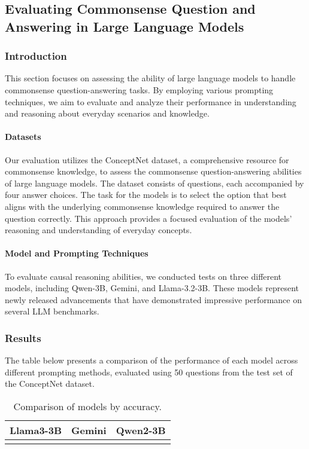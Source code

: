 \subsection{Evaluating Commonsense Question and Answering in Large Language Models}

\subsubsection{Introduction}
This section focuses on assessing the ability of large language models to handle commonsense question-answering tasks. By employing various prompting techniques, we aim to evaluate and analyze their performance in understanding and reasoning about everyday scenarios and knowledge.

\paragraph{Datasets}
Our evaluation utilizes the ConceptNet dataset, a comprehensive resource for commonsense knowledge, to assess the commonsense question-answering abilities of large language models. The dataset consists of questions, each accompanied by four answer choices. The task for the models is to select the option that best aligns with the underlying commonsense knowledge required to answer the question correctly. This approach provides a focused evaluation of the models' reasoning and understanding of everyday concepts.


\paragraph{Model and Prompting Techniques} 
To evaluate causal reasoning abilities, we conducted tests on three different models, including Qwen-3B, Gemini, and Llama-3.2-3B. These models represent newly released advancements that have demonstrated impressive performance on several LLM benchmarks.

\subsubsection{Results}
The table below presents a comparison of the performance of each model across different prompting methods, evaluated using 50 questions from the test set of the ConceptNet dataset.

\begin{table}[ht]
  \centering
  \begin{tabular}{|c|c|c|}
      \hline
      \textbf{Llama3-3B}    & \textbf{Gemini} & \textbf{Qwen2-3B} \\ \hline

         &  & \\ \hline 

  \end{tabular}
  \caption{Comparison of models by accuracy.}
  \label{tab:model_comparison}
\end{table}
